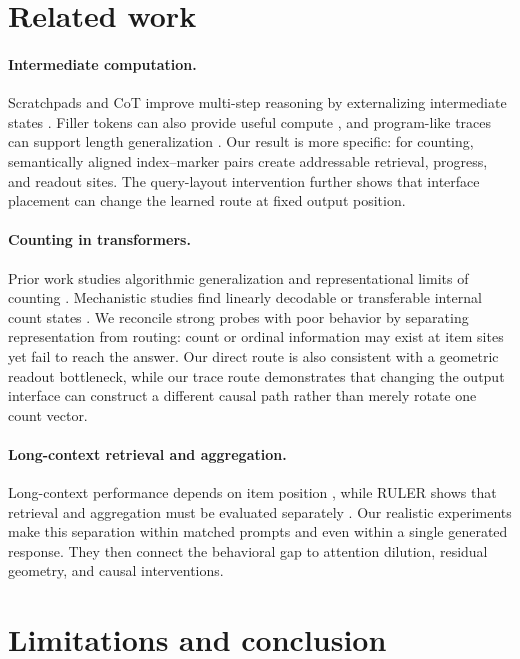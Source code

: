 \documentclass[11pt]{article}
\begin{document}
\section{Related work}

\paragraph{Intermediate computation.}
Scratchpads and CoT improve multi-step reasoning by externalizing intermediate states \citep{nye2021scratchpads,wei2022cot}. Filler tokens can also provide useful compute \citep{pfau2024dot}, and program-like traces can support length generalization \citep{hou2025turing}. Our result is more specific: for counting, semantically aligned index--marker pairs create addressable retrieval, progress, and readout sites. The query-layout intervention further shows that interface placement can change the learned route at fixed output position.

\paragraph{Counting in transformers.}
Prior work studies algorithmic generalization and representational limits of counting \citep{ouellette2023counting,yehudai2024count}. Mechanistic studies find linearly decodable or transferable internal count states \citep{hasani2025counting,garcia2026wrong}. We reconcile strong probes with poor behavior by separating representation from routing: count or ordinal information may exist at item sites yet fail to reach the answer. Our direct route is also consistent with a geometric readout bottleneck, while our trace route demonstrates that changing the output interface can construct a different causal path rather than merely rotate one count vector.

\paragraph{Long-context retrieval and aggregation.}
Long-context performance depends on item position \citep{liu2024lost}, while RULER shows that retrieval and aggregation must be evaluated separately \citep{hsieh2024ruler}. Our realistic experiments make this separation within matched prompts and even within a single generated response. They then connect the behavioral gap to attention dilution, residual geometry, and causal interventions.

\section{Limitations and conclusion}
\end{document}

